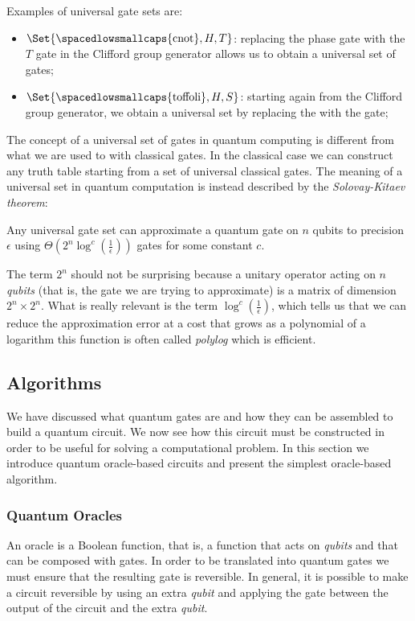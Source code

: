 Examples of universal gate sets are: 
\begin{itemize}
	\item $\Set{ \text{\spacedlowsmallcaps{cnot}}, H, T}$: replacing the phase gate with the $T$ gate in the Clifford group generator allows us to obtain a universal set of gates;
	\item $\Set{ \text{\spacedlowsmallcaps{toffoli}}, H, S}$: starting again from the Clifford group generator, we obtain a universal set by replacing the  with the  gate;
\end{itemize}

The concept of a universal set of gates in quantum computing is different from what we are used to with classical gates. In the classical case we can construct any truth table starting from a set of universal classical gates. The meaning of a universal set in quantum computation is instead described by the \emph{Solovay-Kitaev theorem}:
\begin{theorem}
	Any universal gate set can approximate a quantum gate on $n$ qubits to precision $\epsilon$ using $\Theta(2^n\log^c(\frac{1}{\epsilon}))$ gates for some constant $c$.
\end{theorem} 

The term $2^n$ should not be surprising because a unitary operator acting on $n$ \emph{qubits} (that is, the gate we are trying to approximate) is a matrix of dimension $2^n \times 2^n$. What is really relevant is the term $\log^c(\frac{1}{\epsilon})$, which tells us that we can reduce the approximation error at a cost that grows as a polynomial of a logarithm \textemdash{}this function is often called \emph{polylog}\textemdash{} which is efficient.

\subsection{Algorithms}
We have discussed what quantum gates are and how they can be assembled to build a quantum circuit. We now see how this circuit must be constructed in order to be useful for solving a computational problem. In this section we introduce quantum oracle-based circuits and present the simplest oracle-based algorithm.

\subsubsection*{Quantum Oracles}
An oracle is a Boolean function, that is, a function that acts on \emph{qubits} and that can be composed with gates. In order to be translated into quantum gates we must ensure that the resulting gate is reversible. In general, it is possible to make a circuit reversible by using an extra \emph{qubit} and applying the  gate between the output of the circuit and the extra \emph{qubit}. 

